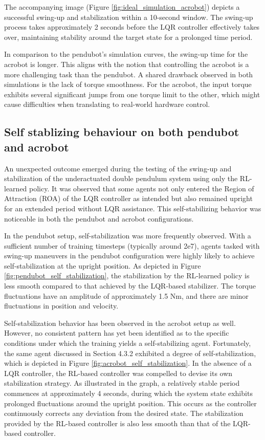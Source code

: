 The accompanying image (Figure \ref{fig:ideal_simulation_acrobot}) depicts a successful swing-up and stabilization within a 10-second window. The swing-up process takes approximately 2 seconds before the LQR controller effectively takes over, maintaining stability around the target state for a prolonged time period.

In comparison to the pendubot's simulation curves, the swing-up time for the acrobot is longer. This aligns with the notion that controlling the acrobot is a more challenging task than the pendubot. A shared drawback observed in both simulations is the lack of torque smoothness. For the acrobot, the input torque exhibits several significant jumps from one torque limit to the other, which might cause difficulties when translating to real-world hardware control.

\subsection{Self stablizing behaviour on both pendubot and acrobot}
An unexpected outcome emerged during the testing of the swing-up and stabilization of the underactuated double pendulum system using only the RL-learned policy. It was observed that some agents not only entered the Region of Attraction (ROA) of the LQR controller as intended but also remained upright for an extended period without LQR assistance. This self-stabilizing behavior was noticeable in both the pendubot and acrobot configurations.

In the pendubot setup, self-stabilization was more frequently observed. With a sufficient number of training timesteps (typically around 2e7), agents tasked with swing-up maneuvers in the pendubot configuration were highly likely to achieve self-stabilization at the upright position. As depicted in Figure \ref{fig:pendubot_self_stabilization}, the stabilization by the RL-learned policy is less smooth compared to that achieved by the LQR-based stabilizer. The torque fluctuations have an amplitude of approximately 1.5 Nm, and there are minor fluctuations in position and velocity.

Self-stabilization behavior has been observed in the acrobot setup as well. However, no consistent pattern has yet been identified as to the specific conditions under which the training yields a self-stabilizing agent. Fortunately, the same agent discussed in Section 4.3.2 exhibited a degree of self-stabilization, which is depicted in Figure \ref{fig:acrobot_self_stabilization}. In the absence of a LQR controller, the RL-based controller was compelled to devise its own stabilization strategy. As illustrated in the graph, a relatively stable period commences at approximately 4 seconds, during which the system state exhibits prolonged fluctuations around the upright position. This occurs as the controller continuously corrects any deviation from the desired state. The stabilization provided by the RL-based controller is also less smooth than that of the LQR-based controller.

